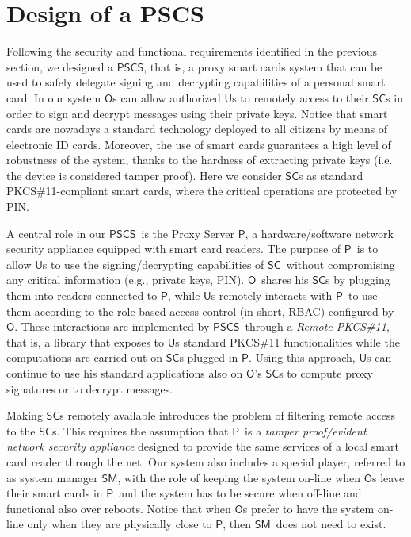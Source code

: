 \documentclass{sig-alternate}
\newcommand{\Owner}{\ensuremath{\mathsf{O}}}
\newcommand{\SM}{\ensuremath{\mathsf{SM}}}
\newcommand{\User}{\ensuremath{\mathsf{U}}}
\newcommand{\Proxy}{\ensuremath{\mathsf{P}}}
\newcommand{\SC}{\ensuremath{\mathsf{SC}}}
\newcommand{\PSCS}{\ensuremath{\mathsf{PSCS}}}
\begin{document}
\section{Design of a PSCS}

Following the security and functional requirements identified in the previous section, we designed a \PSCS , that is, a proxy smart cards system that can be used
to safely delegate signing and decrypting capabilities of a personal smart card. In our system \Owner s can allow authorized \User s to remotely access to their \SC s in order to sign and decrypt messages using their private keys. Notice that smart cards are nowadays a standard technology deployed to all citizens by means of electronic ID cards. Moreover, the use of smart cards guarantees a high level of robustness of the system, thanks to the hardness of extracting private keys (i.e. the device is considered tamper proof). Here we consider \SC s as standard PKCS\#11-compliant smart cards, where the critical operations are protected by PIN.

A central role in our \PSCS\ is the Proxy Server \Proxy, a hardware/software network security appliance equipped with smart card readers. The purpose of \Proxy\ is to allow \User s to use the signing/decrypting capabilities of \SC\ without compromising any critical information (e.g., private keys, PIN).  \Owner\ shares his \SC s by plugging them into readers connected to \Proxy, while \User s remotely interacts with \Proxy\ to use them according to the role-based access control (in short, RBAC) configured by \Owner . These interactions are implemented by \PSCS\ through a \emph{Remote PKCS\#11}, that is, a library that exposes to \User s standard PKCS\#11 functionalities while the computations are carried out on \SC s plugged in \Proxy . Using this approach, \User s can continue to use his standard applications also on \Owner 's \SC s to compute proxy signatures or to decrypt messages.

Making \SC s remotely available introduces the problem of filtering remote access to the \SC s. This requires the assumption that \Proxy\  is a {\sl tamper proof/evident network security appliance} designed to provide the same services of a local smart card reader through the net. Our system also includes a special player, referred to as system manager \SM, with the role of keeping the system on-line when \Owner s leave their smart cards in \Proxy\ and the system has to be secure when off-line and functional also over reboots. Notice that when \Owner s prefer to have the system on-line only when they are physically close to \Proxy, then \SM\ does not need to exist.
\end{document}
